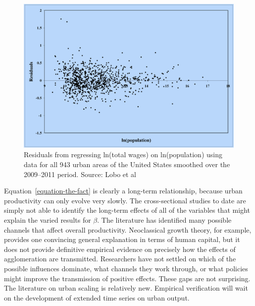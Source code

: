 \begin{figure}
    \centering
    \includegraphics[scale=0.25]{fig/Residuals-Lobo.png}
    \caption{Residuals from regressing ln(total wages) on ln(population) using data for all 943 urban areas of the United States smoothed over the 2009–2011 period. Source: Lobo et al \cite{loboUrbanScalingProduction2013}}
    \label{fig:Residuals-Lobo}
\end{figure}


Equation~\ref{equation-the-fact} is clearly a long-term relationship, because urban productivity can only evolve very slowly. The cross-sectional studies to date are simply not able to identify the long-term effects of all of the variables that might explain the varied results for  $\beta$. The literature has identified many possible channels that affect overall productivity. Neoclassical growth theory, for example, provides one convincing general explanation in terms of human capital, but it does not provide definitive empirical evidence on precisely how the effects of agglomeration are transmitted. Researchers have not settled on which  of the possible influences dominate, what channels they work through, or what policies might improve the transmission of positive effects. These gaps are  not surprising. The literature on urban scaling is relatively new.  Empirical verification will wait on the development of extended time series on urban output.


